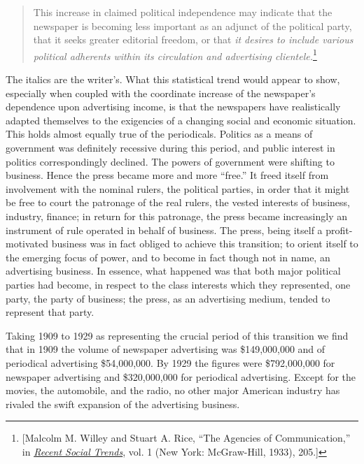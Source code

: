 \documentclass[openany,nobib]{tufte-book}
\begin{document}
\begin{quote}
This increase in claimed political independence may indicate that the
newspaper is becoming less important as an adjunct of the political
party, that it seeks greater editorial freedom, or that \emph{it desires
to include various political adherents within its circulation and
advertising clientele.}\footnote{{[}Malcolm M. Willey and Stuart A. Rice, ``The Agencies of
  Communication,'' in
  \emph{\href{http://www.worldcat.org/oclc/544930}{Recent Social
  Trends}}, vol. 1 (New York: McGraw-Hill, 1933), 205.{]}}
\end{quote}

The italics are the writer's. What this statistical trend would appear
to show, especially when coupled with the coordinate increase of the
newspaper's dependence upon advertising income, is that the newspapers
have realistically adapted themselves to the exigencies of a changing
social and economic situation. This holds almost equally true of the
periodicals. Politics as a means of government was definitely recessive
during this period, and public interest in politics correspondingly
declined. The powers of government were shifting to business. Hence the
press became more and more ``free.'' It freed itself from involvement
with the nominal rulers, the political parties, in order that it might
be free to court the patronage of the real rulers, the vested interests
of business, industry, finance; in return for this patronage, the press
became increasingly an instrument of rule operated in behalf of
business. The press, being itself a profit-motivated business was in
fact obliged to achieve this transition; to orient itself to the
emerging focus of power, and to become in fact though not in name, an
advertising business. In essence, what happened was that both major
political parties had become, in respect to the class interests which
they represented, one party, the party of business; the press, as an
advertising medium, tended to represent that party.

Taking 1909 to 1929 as representing the crucial period of this
transition we find that in 1909 the volume of newspaper advertising was
\$149,000,000 and of periodical advertising \$54,000,000. By 1929 the
figures were \$792,000,000 for newspaper advertising and \$320,000,000
for periodical advertising. Except for the movies, the automobile, and
the radio, no other major American industry has rivaled the swift
expansion of the advertising business.
\end{document}
